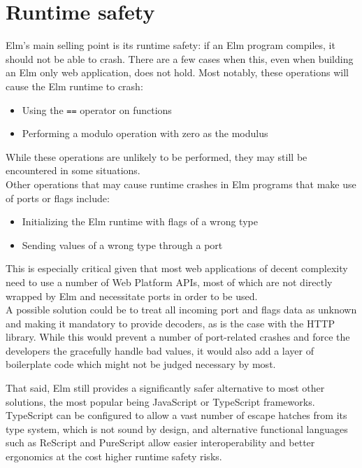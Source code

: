 \section{Runtime safety}
Elm's main selling point is its runtime safety: if an Elm program compiles, it should not be able to crash. There are a few cases when this, even when building an Elm only web application, does not hold. Most notably, these operations will cause the Elm runtime to crash:
\begin{itemize}
    \item Using the \texttt{==} operator on functions \cite{noauthor_corehints5md_nodate}
    \item Performing a modulo operation with zero as the modulus \cite{noauthor_corehints11md_nodate}
\end{itemize}
While these operations are unlikely to be performed, they may still be encountered in some situations.\\

Other operations that may cause runtime crashes in Elm programs that make use of ports or flags include:
\begin{itemize}
    \item Initializing the Elm runtime with flags of a wrong type \cite{noauthor_corehints2md_nodate}
    \item Sending values of a wrong type through a port \cite{noauthor_corehints4md_nodate}
\end{itemize}
This is especially critical given that most web applications of decent complexity need to use a number of Web Platform APIs, most of which are not directly wrapped by Elm and necessitate ports in order to be used.\\
A possible solution could be to treat all incoming port and flags data as unknown and making it mandatory to provide decoders, as is the case with the HTTP library. While this would prevent a number of port-related crashes and force the developers the gracefully handle bad values, it would also add a layer of boilerplate code which might not be judged necessary by most.

That said, Elm still provides a significantly safer alternative to most other solutions, the most popular being JavaScript or TypeScript frameworks. TypeScript can be configured to allow a vast number of escape hatches from its type system, which is not sound by design, and alternative functional languages such as ReScript and PureScript allow easier interoperability and better ergonomics at the cost higher runtime safety risks.

